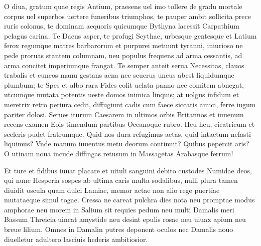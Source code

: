 \documentclass{book}
\newenvironment {carmen} [1] [\relax] 
  {\Titulus \Versus \incipit*\numerus{1}#1}
  {\endVersus}
\newcommand {\Alcaic}    {\Forma \strophae {0 \poena 01 \poena 2}}
\newcommand {\GlycAscl}  {\Forma \strophae {2 \poena 0}}
\begin{document}
\begin{carmen}[\Alcaic]


O diua, gratum quae regis Antium,
 praesens uel imo tollere de gradu
      mortale corpus uel superbos
      uertere funeribus triumphos,
 te pauper ambit sollicita prece               
 ruris colonus, te dominam aequoris
      quicumque Bythyna lacessit
      Carpathium pelagus carina.
 Te Dacus asper, te profugi Scythae,
 urbesque gentesque et Latium ferox               
      regumque matres barbarorum et
      purpurei metuunt tyranni,
 iniurioso ne pede proruas
 stantem columnam, neu populus frequens
       ad arma cessantis, ad arma
      concitet imperiumque frangat.               
 Te semper anteit serua Necessitas,
 clauos trabalis et cuneos manu
      gestans aena nec seuerus
       uncus abest liquidumque plumbum;               
 te Spes et albo rara Fides colit
 uelata panno nec comitem abnegat,
      utcumque mutata potentis
      ueste domos inimica linquis;
 at uolgus infidum et meretrix retro               
 periura cedit, diffugiunt cadis
      cum faece siccatis amici,
      ferre iugum pariter dolosi.
 Serues iturum Caesarem in ultimos
 orbis Britannos et iuuenum recens               
      examen Eois timendum
      partibus Oceanoque rubro.
 Heu heu, cicatricum et sceleris pudet
 fratrumque. Quid nos dura refugimus
       aetas, quid intactum nefasti
      liquimus? Vnde manum iuuentus               
 metu deorum continuit? Quibus
 pepercit aris? O utinam noua
      incude diffingas retusum in
       Massagetas Arabasque ferrum!                

\end{carmen}

\begin{carmen}[\GlycAscl]


      Et ture et fidibus iuuat
 placare et uituli sanguini debito
      custodes Numidae deos,
 qui nunc Hesperia sospes ab ultima
       caris multa sodalibus,               
 nulli plura tamen diuidit oscula
      quam dulci Lamiae, memor
 actae non alio rege puertiae
      mutataeque simul togae.
 Cressa ne careat pulchra dies nota               
      neu promptae modus amphorae
 neu morem in Salium sit requies pedum
      neu multi Damalis meri
 Bassum Threicia uincat amystide
       neu desint epulis rosae               
 neu uiuax apium neu breue lilium.
      Omnes in Damalin putres
 deponent oculos nec Damalis nouo
      diuelletur adultero
 lasciuis hederis ambitiosior.                

\end{carmen}
\end{document}
